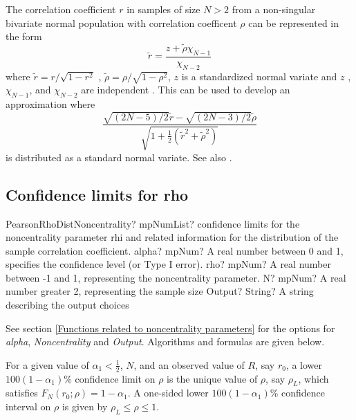 \vspace{0.3cm}
The correlation coefficient $r$ in samples of size $N>2$ from a non-singular bivariate normal population with correlation coefficent $\rho$ can be represented in the form
\begin{equation}
	\tilde{r} = \frac{z+ \tilde{\rho} \chi_{N-1}}{\chi_{N-2}}
\end{equation}
where $\tilde{r} =r/\sqrt{1-r^2}$ , $\tilde{\rho} =\rho/\sqrt{1-\rho^2}$, $z$ is a standardized normal variate and  $z$ , $\chi_{N-1}$, and $\chi_{N-2}$ are independent \citep{ruben_1966}. This can be used to develop an approximation where
\begin{equation}
	\frac{\sqrt{(2N-5)/2} \tilde{r} - \sqrt{(2N-3)/2} \tilde{\rho}}{\sqrt{1+ \tfrac{1}{2}( \tilde{r}^2+\tilde{\rho}^2)}}
\end{equation}
is distributed as a standard normal variate. See also \cite{akahira_1998}.







\subsection{Confidence limits for rho}
\label{PearsonRhoDistributionNC}


\begin{mpFunctionsExtract}
	\mpFunctionFourNotImplemented
	{PearsonRhoDistNoncentrality? mpNumList? confidence limits for the noncentrality parameter rhi and related information for the distribution of the sample correlation coefficient.}
	{alpha? mpNum? A real number between 0 and 1, specifies the confidence level (or Type I error).}
	{rho? mpNum? A real number between -1 and 1, representing the noncentrality parameter.}
	{N? mpNum? A real number greater 2, representing the sample size}
	{Output? String? A string describing the output choices}
\end{mpFunctionsExtract}


\vspace{0.3cm}
See section \ref{Functions related to noncentrality parameters} for the options for  {\itshape\sffamily alpha}, {\itshape\sffamily Noncentrality} and {\itshape\sffamily Output}. Algorithms and formulas are given below.

\vspace{0.3cm}
For a given value of $\alpha_1<\tfrac{1}{2}$, $N$, and an observed value of $R$, say $r_0$, a lower $100(1-\alpha_1)\%$ confidence limit on $\rho$ is the unique value of $\rho$, say $\rho_L$, which satisfies $F_N(r_0; \rho) = 1-\alpha_1$. A one-sided lower  $100(1-\alpha_1)\%$ confidence interval on $\rho$ is given by $\rho_L \leq \rho \leq 1$.


